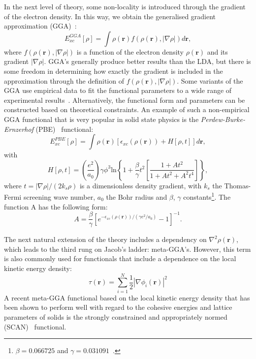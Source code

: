 \begin{refsection}
 \label{dft:sec-GGA}
In the next level of theory, some non-locality is introduced through the 
gradient of the electron density. In this way, we obtain the 
generalised gradient approximation (\gls{GGA})~\cite{Perdew1992}: 
\begin{equation} 
E_{xc}^{GGA}[\rho] = \int \rho(\mathbf{r}) f(\rho(\mathbf{r}),\left| \nabla 
\rho\right|)d\mathbf{r}, 
\end{equation} 
where $f(\rho(\mathbf{r}),\left| \nabla \rho\right|)$ is a function of the 
electron density $\rho(\mathbf{r})$ and its gradient $\left| \nabla 
\rho\right|$. \gls{GGA}'s generally produce better results than the \gls{LDA}, but 
there is some freedom in determining how exactly the gradient is included in 
the approximation through the definition of $f(\rho(\mathbf{r}),\left| \nabla 
\rho\right|)$. Some variants of the \gls{GGA} use empirical data to fit the 
functional parameters to a wide range of experimental results~\cite{Becke1988, Keal2004}. Alternatively, the functional form and parameters can be constructed based on theoretical constraints. An example of such a 
non-empirical \gls{GGA} functional that is very popular in solid state physics is the 
\textit{Perdew-Burke-Ernzerhof} (\gls{PBE})~\cite{Perdew1996} functional: 
\begin{equation} 
E_{xc}^{PBE}[\rho] = \int \rho(\mathbf{r}) \left[ 
\epsilon_{xc}(\rho(\mathbf{r})) + H[\rho,t] \right] d\mathbf{r}, 
\end{equation} 
with 
\begin{equation} 
H[\rho,t] = \left( \frac{e^2}{a_0} \right) \gamma \phi^3 \text{ln} \left\{ 1 + 
\frac{\beta}{\gamma} t^2 \left[ \frac{1 + A t^2}{1 + A t^2 + A^2 t^4} \right] 
\right\}, 
\end{equation} 
where $t = \left| \nabla \rho \right|/(2 k_s\rho)$ is a dimensionless density 
gradient, with $k_s$ the Thomas-Fermi screening wave number, $a_0$ the Bohr 
radius and $\beta$, $\gamma$ constants\footnote{$\beta = 0.066725$ and $\gamma 
= 0.031091$~\cite{Kohanoff2006}.}. The function A has the following form: 
\begin{equation} 
A = \frac{\beta}{\gamma} \left[ e^{-\epsilon_{xc}(\rho(\mathbf{r}))/(\gamma 
e^2 /a_0)} - 1 \right]^{-1}. 
\end{equation} 

 \label{dft:sec-metaGGA}
The next natural extension of the theory includes a dependency on $\nabla^2 
\rho(\mathbf{r})$, which leads to the third rung on Jacob's ladder: 
meta-GGA's. However, this term is also commonly used for functionals that 
include a dependence on the local kinetic energy density: 
\begin{equation} 
\tau (\mathbf{r}) = \sum_{i=1}^N \frac{1}{2} \left| \nabla \phi_i (\mathbf{r}) 
\right|^2 
\end{equation} 
A recent meta-GGA functional based on the local kinetic energy density that 
has been shown to perform well with regard to the cohesive energies and 
lattice parameters of solids is the strongly constrained and appropriately 
normed (\gls{SCAN})~\cite{Sun2015} functional. 
 

\end{refsection}
